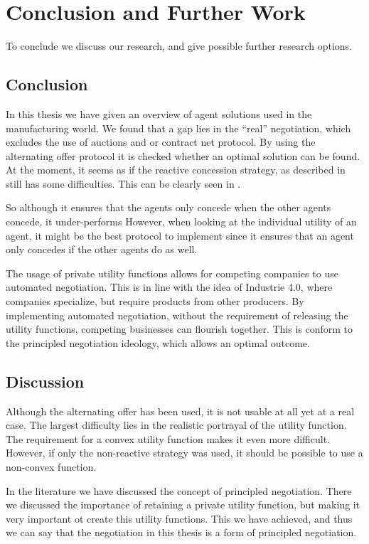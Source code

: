 \chapter{Conclusion and Further Work}
To conclude we discuss our research, and give possible further research options.
\section{Conclusion}
In this thesis we have given an overview of agent solutions used in the manufacturing world. We found that a gap lies in the ``real'' negotiation, which excludes the use of auctions and or contract net protocol. By using the alternating offer protocol it is checked whether an optimal solution can be found. At the moment, it seems as if the reactive concession strategy, as described in \citet{zheng2015automated} still has some difficulties. This can be clearly seen in . 

So although it ensures that the agents only concede when the other agents concede, it under-performs However, when looking at the individual utility of an agent, it might be the best protocol to implement since it ensures that an agent only concedes if the other agents do as well.

The usage of private utility functions allows for competing companies to use automated negotiation. This is in line with the idea of Industrie 4.0, where companies specialize, but require products from other  producers. By implementing automated negotiation, without the requirement of releasing the utility functions, competing businesses can flourish together. This is conform to the principled negotiation ideology, which allows an optimal outcome.

\section{Discussion}
Although the alternating offer has been used, it is not usable at all yet at a real case. The largest difficulty lies in the realistic portrayal of the utility function. The requirement for a convex utility function makes it even more difficult. However, if only the non-reactive strategy was used, it should be possible to use a non-convex function.

In the literature we have discussed the concept of principled negotiation. There we discussed the importance of retaining a private utility function, but making it very important ot create this utility functions. This we have achieved, and thus we can say that the negotiation in this thesis is a form of principled negotiation.

